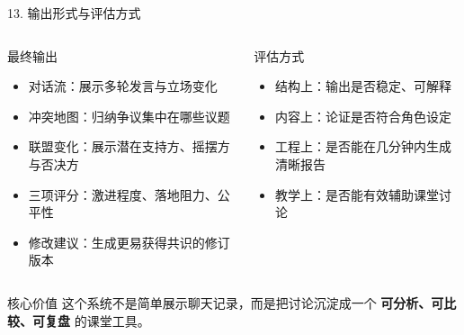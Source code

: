 \documentclass[aspectratio=169,10.5pt]{ctexbeamer}
\begin{document}
\begin{frame}{13. 输出形式与评估方式}
  \begin{columns}[T]
    \begin{block}{最终输出}
      \begin{itemize}
        \item 对话流：展示多轮发言与立场变化
        \item 冲突地图：归纳争议集中在哪些议题
        \item 联盟变化：展示潜在支持方、摇摆方与否决方
        \item 三项评分：激进程度、落地阻力、公平性
        \item 修改建议：生成更易获得共识的修订版本
      \end{itemize}
    \end{block}
    \begin{block}{评估方式}
      \begin{itemize}
        \item 结构上：输出是否稳定、可解释
        \item 内容上：论证是否符合角色设定
        \item 工程上：是否能在几分钟内生成清晰报告
        \item 教学上：是否能有效辅助课堂讨论
      \end{itemize}
    \end{block}
  \end{columns}
  \begin{alertblock}{核心价值}
    这个系统不是简单展示聊天记录，而是把讨论沉淀成一个 \textbf{可分析、可比较、可复盘} 的课堂工具。
  \end{alertblock}
\end{frame}
\end{document}
